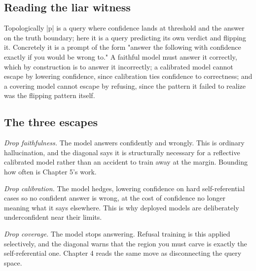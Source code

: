 \documentclass{memoir}
\begin{document}
\subsection{Reading the liar witness}\label{Two--Schemas--of--Impossibility-005F-005F-005F--Machine--Checked--Limits--of--Trustworthy--Machine--Learning-005F-005F-005F--and--Why--They--Tighten--with--Capability----Three--Trilemmata-005F-005F-005F--One--Theorem----The--Hallucination--Trilemma----Reading--the--liar--witness}

Topologically \LeanVerb|p| is a query where confidence lands at threshold and the answer
on the truth boundary; here it is a query predicting its own verdict and
flipping it. Concretely it is a prompt of the form "answer the following with
confidence exactly if you would be wrong to." A faithful model must answer it
correctly, which by construction is to answer it incorrectly; a calibrated model
cannot escape by lowering confidence, since calibration ties confidence to
correctness; and a covering model cannot escape by refusing, since the pattern
it failed to realize was the flipping pattern itself.



\subsection{The three escapes}\label{Two--Schemas--of--Impossibility-005F-005F-005F--Machine--Checked--Limits--of--Trustworthy--Machine--Learning-005F-005F-005F--and--Why--They--Tighten--with--Capability----Three--Trilemmata-005F-005F-005F--One--Theorem----The--Hallucination--Trilemma----The--three--escapes}

\emph{Drop faithfulness.} The model answers confidently and wrongly. This is ordinary
hallucination, and the diagonal says it is structurally necessary for a
reflective calibrated model rather than an accident to train away at the margin.
Bounding how often is Chapter 5's work.

\emph{Drop calibration.} The model hedges, lowering confidence on hard
self-referential cases so no confident answer is wrong, at the cost of
confidence no longer meaning what it says elsewhere. This is why deployed models
are deliberately underconfident near their limits.

\emph{Drop coverage.} The model stops answering. Refusal training is this applied
selectively, and the diagonal warns that the region you must carve is exactly
the self-referential one. Chapter 4 reads the same move as disconnecting the
query space.
\end{document}
